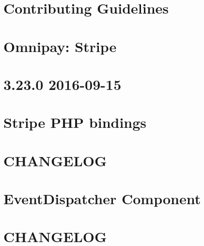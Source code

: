 \let\mypdfximage\pdfximage\def\pdfximage{\immediate\mypdfximage}\documentclass[twoside]{book}
\newcommand{\+}{\discretionary{\mbox{\scriptsize$\hookleftarrow$}}{}{}}
\begin{document}
\chapter{Contributing Guidelines}
\label{md_pixel_shop_vendor_omnipay_stripe__c_o_n_t_r_i_b_u_t_i_n_g}

\chapter{Omnipay\+: Stripe}
\label{md_pixel_shop_vendor_omnipay_stripe__r_e_a_d_m_e}

\chapter{3.23.0 2016-\/09-\/15}
\label{md_pixel_shop_vendor_stripe_stripe_php__c_h_a_n_g_e_l_o_g}

\chapter{Stripe PHP bindings}
\label{md_pixel_shop_vendor_stripe_stripe_php__r_e_a_d_m_e}

\chapter{CHANGELOG}
\label{md_pixel_shop_vendor_symfony_event_dispatcher__c_h_a_n_g_e_l_o_g}

\chapter{Event\+Dispatcher Component}
\label{md_pixel_shop_vendor_symfony_event_dispatcher__r_e_a_d_m_e}

\chapter{CHANGELOG}
\label{md_pixel_shop_vendor_symfony_http_foundation__c_h_a_n_g_e_l_o_g}

\end{document}
